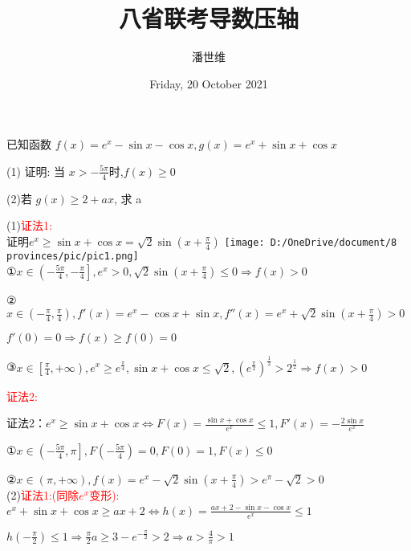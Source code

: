 \documentclass[a4paper,12pt]{article}
\begin{document}
\title {八省联考导数压轴}
\author{潘世维}
\date{Friday, 20 October 2021}
\maketitle

已知函数 $ f(x)=e^{x}-\sin x-\cos x, g(x)=e^{x}+\sin x+\cos x$


(1) 证明: 当 $ x>-\frac{5 \pi}{4}  $时,$  f(x) \geq 0 $



(2)若 $ g(x) \geq 2+a x $, 求  a 
\begin{flushleft}

(1)\textcolor{red}{证法1:}\\
证明$e^x \ge \sin x + \cos x = \sqrt 2 \sin \left( x + \frac{\pi }{4} \right) $
\texttt{[image: D:/OneDrive/document/8 provinces/pic/pic1.png]}\\
①$x \in \left( { - \frac{{5\pi }}{4}, - \frac{\pi }{4}} \right],{e^x} > 0,\sqrt 2 \sin \left( {x + \frac{\pi }{4}} \right) \le 0 \Rightarrow f(x) > 0$

②$x \in \left( { - \frac{\pi }{4},\frac{\pi }{4}} \right),f'(x) = {e^x} - \cos x + \sin x,f''(x) = {e^x} + \sqrt 2 \sin \left( {x + \frac{\pi }{4}} \right) > 0$

$  f'(0) = 0 \Rightarrow f(x) \ge f(0) = 0$

③$\left. {x \in \left[ {\frac{\pi }{4}, + \infty } \right.} \right),{e^x} \ge {e^{\frac{\pi }{4}}},\sin x + \cos x \le \sqrt 2 ,{\left( {{e^{\frac{\pi }{2}}}} \right)^{\frac{1}{2}}} > {2^{\frac{1}{2}}} \Rightarrow f(x) > 0$

\textcolor{red}{证法2:}

证法2：$e^x \ge \sin x + \cos x \Leftrightarrow F(x) = \frac{{\sin x + \cos x}}{{{e^x}}} \le 1 ,F'(x) =  - \frac{{2\sin x}}{{{e^x}}}$

①$x \in \left. {\left( { - \frac{{5\pi }}{4},\pi } \right.} \right],F( - \frac{{5\pi }}{4}) = 0,F(0) = 1,F(x) \le 0$

②$\left. {x \in \left( \pi , + \infty  \right.} \right),f(x) = {e^x} - \sqrt 2 \sin (x + \frac{\pi }{4}) > {e^\pi } - \sqrt 2  > 0$
\\(2)\textcolor{red}{证法1:(同除$e^x$变形):}
${e^x} + \sin x + \cos x \ge ax + 2 \Leftrightarrow h(x) = \frac{{ax + 2 - \sin x - \cos x}}{{{e^x}}} \le 1$

$h\left( { - \frac{\pi }{2}} \right) \le 1 \Rightarrow \frac{\pi }{2}a \ge 3 - {e^{ - \frac{\pi }{2}}} > 2 \Rightarrow a > \frac{4}{\pi } >1 $


\end{flushleft}
\end{document}
